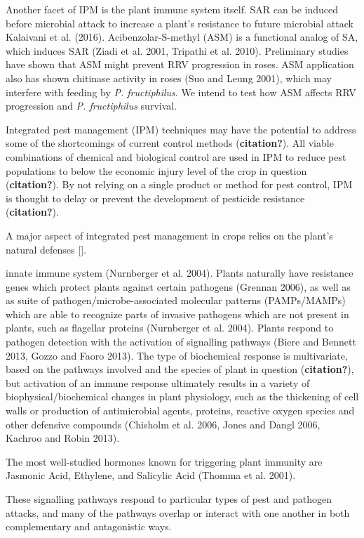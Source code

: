 \documentclass[12pt,final,CPage]{ufthesis}
\begin{document}
{  Another facet of IPM is the plant immune system itself. SAR can be induced before microbial attack to increase a plant's resistance to future microbial attack Kalaivani et al. (2016). Acibenzolar-S-methyl (ASM) is a functional analog of SA, which induces SAR (Ziadi et al. 2001, Tripathi et al. 2010). Preliminary studies have shown that ASM might prevent RRV progression in roses. ASM application also has shown chitinase activity in roses (Suo and Leung 2001), which may interfere with feeding by \emph{P. fructiphilus}. We intend to test how ASM affects RRV progression and \emph{P. fructiphilus} survival.

  Integrated pest management (IPM) techniques may have the potential to address some of the shortcomings of current control methods (\textbf{citation?}). All viable combinations of chemical and biological control are used in IPM to reduce pest populations to below the economic injury level of the crop in question (\textbf{citation?}). By not relying on a single product or method for pest control, IPM is thought to delay or prevent the development of pesticide resistance (\textbf{citation?}).

  A major aspect of integrated pest management in crops relies on the plant's natural defenses {[}{]}.

  innate immune system (Nurnberger et al. 2004). Plants naturally have resistance genes which protect plants against certain pathogens (Grennan 2006), as well as as suite of pathogen/microbe-associated molecular patterns (PAMPs/MAMPs) which are able to recognize parts of invasive pathogens which are not present in plants, such as flagellar proteins (Nurnberger et al. 2004). Plants respond to pathogen detection with the activation of signalling pathways (Biere and Bennett 2013, Gozzo and Faoro 2013). The type of biochemical response is multivariate, based on the pathways involved and the species of plant in question (\textbf{citation?}), but activation of an immune response ultimately results in a variety of biophysical/biochemical changes in plant physiology, such as the thickening of cell walls or production of antimicrobial agents, proteins, reactive oxygen species and other defensive compounds (Chisholm et al. 2006, Jones and Dangl 2006, Kachroo and Robin 2013).

  The most well-studied hormones known for triggering plant immunity are Jasmonic Acid, Ethylene, and Salicylic Acid (Thomma et al. 2001).

  These signalling pathways respond to particular types of pest and pathogen attacks, and many of the pathways overlap or interact with one another in both complementary and antagonistic ways.

}
\end{document}
